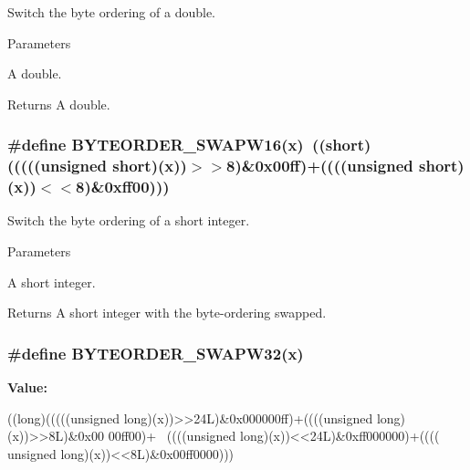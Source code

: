 Switch the byte ordering of a double. 
\begin{DoxyParams}{Parameters}
\item[{\em x}]A double. \end{DoxyParams}
\begin{DoxyReturn}{Returns}
A double. 
\end{DoxyReturn}
\hypertarget{group__byteorder_ga035b5999ffd460b028adbddc114bc1ea}{
\subsubsection[{BYTEORDER\_\-SWAPW16}]{\setlength{\rightskip}{0pt plus 5cm}\#define BYTEORDER\_\-SWAPW16(x)~((short)(((((unsigned short)(x))$>$$>$8)\&0x00ff)+((((unsigned short)(x))$<$$<$8)\&0xff00)))}}
\label{group__byteorder_ga035b5999ffd460b028adbddc114bc1ea}


Switch the byte ordering of a short integer. 
\begin{DoxyParams}{Parameters}
\item[{\em x}]A short integer. \end{DoxyParams}
\begin{DoxyReturn}{Returns}
A short integer with the byte-\/ordering swapped. 
\end{DoxyReturn}
\hypertarget{group__byteorder_ga2361fba0c30f763e8fe3fb2fe0eece43}{
\subsubsection[{BYTEORDER\_\-SWAPW32}]{\setlength{\rightskip}{0pt plus 5cm}\#define BYTEORDER\_\-SWAPW32(x)}}
\label{group__byteorder_ga2361fba0c30f763e8fe3fb2fe0eece43}
{\bfseries Value:}
\begin{DoxyCode}
((long)(((((unsigned long)(x))>>24L)&0x000000ff)+((((unsigned long)(x))>>8L)&0x00
      00ff00)+ \
                                    ((((unsigned long)(x))<<24L)&0xff000000)+((((
      unsigned long)(x))<<8L)&0x00ff0000)))
\end{DoxyCode}


